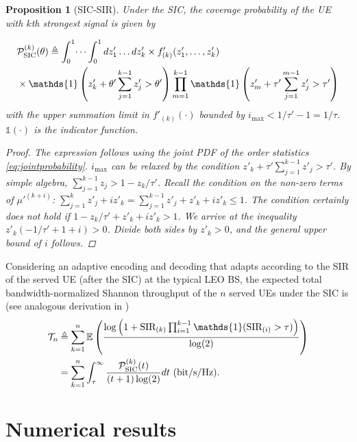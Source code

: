 \documentclass[lettersize,journal]{IEEEtran}
\newtheorem{prop}[theorem]{Proposition}
\begin{document}
\begin{prop}[SIC-SIR]
  Under the SIC, the coverage probability of the UE with $k$th strongest signal is given by
  
  \begin{align}
    \label{eq:SICprob}
     &\mathcal{P}^{(k)}_{\textup{SIC}}(\theta)\triangleq \int_{0}^{1} \dots \int_{0}^{1}d z'_1 \dots  d z'_k \times f'_{(k)}(z'_1,\dots,z'_k)       \\
    &  \times \mathds{1}\left( z'_k+ \theta'\sum_{j=1}^{k-1} z'_j>\theta'  \right)\prod_{m=1}^{k-1} \mathds{1}\left( z'_m+ \tau'\sum_{j=1}^{m-1} z'_j>\tau'  \right)\nonumber
  \end{align}
  with the upper summation limit in $f'_{(k)}(\cdot)$ bounded by $i_{\text{max}} < 1/\tau'-1=1/\tau$. $\mathds{1}(\cdot)$ is the indicator function. 
  \begin{proof}
    The expression follows using the joint PDF of the order statistics \eqref{eq:jointprobability}.  $i_{\text{max}}$ can be relaxed by the condition $z'_{k}+\tau'\sum_{j=1}^{k-1}z'_{j}>\tau'$. By simple algebra, $\sum_{j=1}^{k-1}z_{j}> 1-z_{k}/\tau'$. Recall the condition on the non-zero terms of $\mu'^{(k+i)}$:  $\sum_{j=1}^k z'_{j}+i z'_{k} =\sum_{j=1}^{k-1}z'_{j} +z'_{k}+i z'_{k}  \leq 1$. The condition certainly does \textit{not} hold if $1-z_{k}/\tau'+ z'_{k}+i z'_{k}>1$. We arrive at the inequality $z'_{k} \left(-1/\tau' + 1 +i \right)>0$. Divide both sides by $z'_{k}>0$, and the general upper bound of $i$ follows.
  \end{proof}
\end{prop}


Considering an adaptive encoding and decoding that adapts according to the SIR of the served UE (after the SIC) at the typical LEO BS, the expected total bandwidth-normalized Shannon throughput \cite[Eq. (7.19)]{alma998193414406526} of the $n$ served UEs under the SIC is (see analogous derivation in \cite[Eq. (36)]{10909705})
\begin{align}
  \mathcal{T}_{n}&\triangleq \sum_{k=1}^n \mathbb{E}\left(\frac{\log\Big(1+\text{SIR}_{(k)}\prod_{i=1}^{k-1}\mathds{1}(\text{SIR}_{(i)}>\tau)\Big)}{\log(2)}\right) \nonumber \\
  &=\sum_{k=1}^n\int_{\tau}^{\infty}\frac{\mathcal{P}^{(k)}_{\textup{SIC}}(t)}{(t+1)\log(2)}d t \textup{ (bit/s/Hz)}. \label{eq:throughput}
\end{align}



\section{Numerical results}
  
\end{document}
